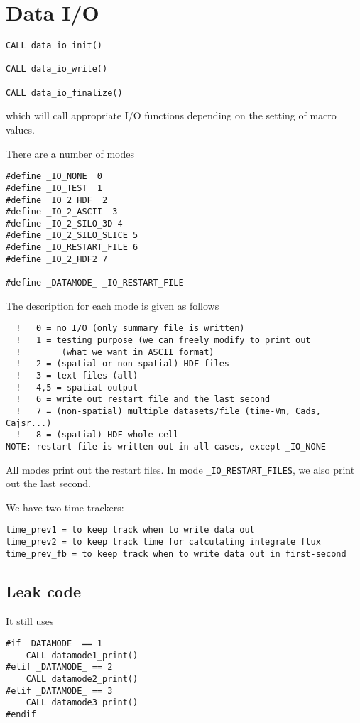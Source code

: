 \chapter{Data I/O}
\label{chap:Data_IO}

\begin{lstlisting}
CALL data_io_init()

CALL data_io_write()

CALL data_io_finalize()
\end{lstlisting}
which will call appropriate I/O functions depending on the setting of
macro values. 

There are a number of modes
\begin{verbatim}
#define _IO_NONE  0  
#define _IO_TEST  1
#define _IO_2_HDF  2
#define _IO_2_ASCII  3
#define _IO_2_SILO_3D 4 
#define _IO_2_SILO_SLICE 5
#define _IO_RESTART_FILE 6 
#define _IO_2_HDF2 7

#define _DATAMODE_ _IO_RESTART_FILE
\end{verbatim}
The description for each mode is given as follows
\begin{verbatim}
  !   0 = no I/O (only summary file is written)
  !   1 = testing purpose (we can freely modify to print out 
  !        (what we want in ASCII format)
  !   2 = (spatial or non-spatial) HDF files
  !   3 = text files (all)
  !   4,5 = spatial output
  !   6 = write out restart file and the last second
  !   7 = (non-spatial) multiple datasets/file (time-Vm, Cads, Cajsr...)
  !   8 = (spatial) HDF whole-cell
NOTE: restart file is written out in all cases, except _IO_NONE  
\end{verbatim}
All modes print out the restart files. In mode \verb!_IO_RESTART_FILES!, we also
print out the last second.

We have two time trackers:
\begin{verbatim}
time_prev1 = to keep track when to write data out
time_prev2 = to keep track time for calculating integrate flux
time_prev_fb = to keep track when to write data out in first-second
\end{verbatim}


\section{Leak code}
\label{sec:IO_leak}

It still uses 
\begin{verbatim}
#if _DATAMODE_ == 1
    CALL datamode1_print()
#elif _DATAMODE_ == 2
    CALL datamode2_print()
#elif _DATAMODE_ == 3
    CALL datamode3_print()
#endif
\end{verbatim}

